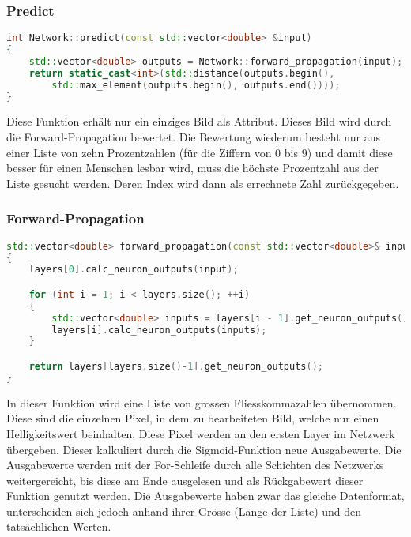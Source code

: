 \subsubsection{Predict}
\label{sec:RealPredictCode}
\begin{lstlisting}[language=c++]
int Network::predict(const std::vector<double> &input) 
{
	std::vector<double> outputs = Network::forward_propagation(input);
	return static_cast<int>(std::distance(outputs.begin(), 
		std::max_element(outputs.begin(), outputs.end()))); 
}
\end{lstlisting}
Diese Funktion erhält nur ein einziges Bild als Attribut. Dieses Bild wird durch die Forward-Propagation bewertet. Die Bewertung wiederum besteht nur aus einer Liste von zehn Prozentzahlen (für die Ziffern von 0 bis 9) und damit diese besser für einen Menschen lesbar wird, muss die höchste Prozentzahl aus der Liste gesucht werden. Deren Index wird dann als errechnete Zahl zurückgegeben.

\subsubsection{Forward-Propagation}
\label{sec:RealForwardPropagationCode}
\begin{lstlisting}[language=c++]
std::vector<double> forward_propagation(const std::vector<double>& input) 
{
	layers[0].calc_neuron_outputs(input);

	for (int i = 1; i < layers.size(); ++i) 
	{
		std::vector<double> inputs = layers[i - 1].get_neuron_outputs();
		layers[i].calc_neuron_outputs(inputs);
	}

	return layers[layers.size()-1].get_neuron_outputs();
}
\end{lstlisting}
In dieser Funktion wird eine Liste von grossen Fliesskommazahlen übernommen. Diese sind die einzelnen Pixel, in dem zu bearbeiteten Bild, welche nur einen Helligkeitswert beinhalten. Diese Pixel werden an den ersten Layer im Netzwerk übergeben. Dieser kalkuliert durch die Sigmoid-Funktion neue Ausgabewerte. Die Ausgabewerte werden mit der For-Schleife durch alle Schichten des Netzwerks weitergereicht, bis diese am Ende ausgelesen und als Rückgabewert dieser Funktion genutzt werden. Die Ausgabewerte haben zwar das gleiche Datenformat, unterscheiden sich jedoch anhand ihrer Grösse (Länge der Liste) und den tatsächlichen Werten.

